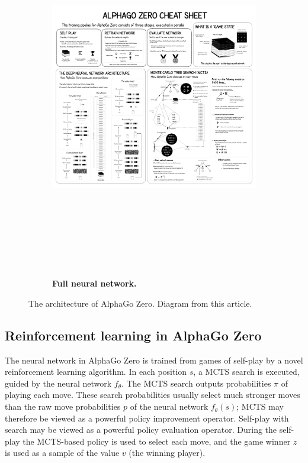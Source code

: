 \documentclass{article}
\begin{document}
\begin{figure}[H]\ContinuedFloat
	\begin{subfigure}{1\textwidth}
		\centering
		\includegraphics[height=16cm,angle=90,trim={1600px 243px 5916px 3678px},clip]{alpha_go_zero_cheat_sheet.png}
		\caption{\textbf{Full neural network.}}
		\label{fig:arch_full}
	\end{subfigure}
	\caption[Caption for LOF]{The architecture of AlphaGo Zero. Diagram from this article.\footnotemark}
\end{figure}


\subsection{Reinforcement learning in AlphaGo Zero}
The neural network in AlphaGo Zero is trained from games of self-play by a novel reinforcement learning algorithm. In each position $s$, a MCTS search is executed, guided by the neural network $f_\theta$. The MCTS search outputs probabilities $\pi$ of playing each move. These search probabilities usually select much stronger moves than the raw move probabilities $p$ of the neural network $f_\theta(s)$; MCTS may therefore be viewed as a powerful policy improvement operator. Self-play with search may be viewed as a powerful policy evaluation operator. During the self-play the MCTS-based policy is used to select each move, and the game winner $z$ is used as a sample of the value $v$ (the winning player).
\end{document}
